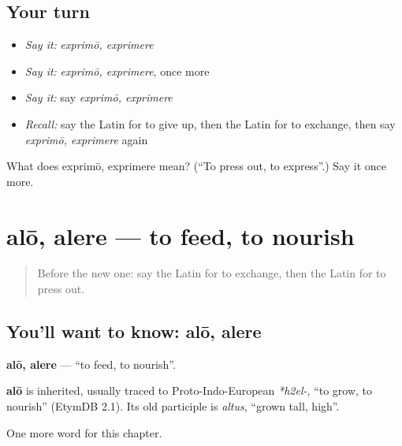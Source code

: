 \subsection*{Your turn}
\begin{itemize}
\raggedright
  \item \emph{Say it:} \emph{exprimō, exprimere}
  \item \emph{Say it:} \emph{exprimō, exprimere}, once more
  \item \emph{Say it:} say \emph{exprimō, exprimere}
  \item \emph{Recall:} say the Latin for to give up, then the Latin for to exchange, then say \emph{exprimō, exprimere} again
\end{itemize}

\begin{tcolorbox}[breakable,colback=teal!4,colframe=teal!35!black,title={Before you move on}]
What does exprimō, exprimere mean? (\textquotedblleft{}To press out, to express\textquotedblright{}.) Say it once more.
\end{tcolorbox}
\section[alō, alere]{alō, alere — to feed, to nourish}

\label{lesson:LA-C260-alo}



\begin{quote}
Before the new one: say the Latin for to exchange, then the Latin for to press out.
\end{quote}

\subsection*{You'll want to know: alō, alere}
\textbf{alō, alere} — \textquotedblleft{}to feed, to nourish\textquotedblright{}.

\begin{cousinweb}
\textbf{alō} is inherited, usually traced to Proto-Indo-European \emph{*h2el-}, \textquotedblleft{}to grow, to nourish\textquotedblright{} (EtymDB 2.1). Its old participle is \emph{altus}, \textquotedblleft{}grown tall, high\textquotedblright{}.
\end{cousinweb}

\begin{grammarlens}[title={What you've built}]
One more word for this chapter.
\end{grammarlens}

